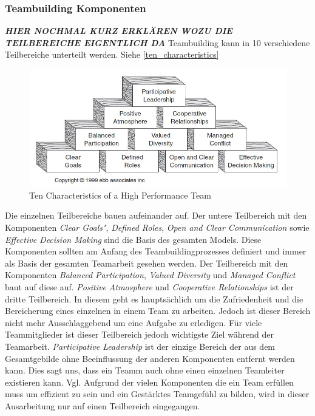 \documentclass[a4paper,11pt]{article}%
\renewcommand{\\}{\vspace*{0.5\baselineskip} \newline}
\begin{document}
{	
		\subsubsection{Teambuilding Komponenten}
	\textit{\textbf{HIER NOCHMAL KURZ ERKLÄREN WOZU DIE TEILBEREICHE EIGENTLICH DA}}
	Teambuilding kann in 10 verschiedene Teilbereiche unterteilt werden. Siehe \autoref{ten_characteristics}
	\begin{figure}[H]
		\begin{footnotesize}
			\includegraphics[width=\textwidth]{Abbildungen/Ten_Characteristics.JPG}
			\caption[Abbildung 1]{Ten Characteristics of a High Performance Team \citep[p. 27]{biech2007pfeiffer}}
			\label{ten_characteristics}
		\end{footnotesize}
	\end{figure}
	Die einzelnen Teilbereiche bauen aufeinander auf. Der untere Teilbereich mit den Komponenten \textit{Clear Goals"}, \textit{Defined Roles}, \textit{Open and Clear Communication} sowie \textit{Effective Decision Making} sind die Basis des gesamten Models. Diese Komponenten sollten am Anfang des Teambuildingprozesses definiert und immer als Basis der gesamten Teamarbeit gesehen werden.\\
	Der Teilbereich mit den Komponenten \textit{Balanced Participation}, \textit{Valued Diversity} und \textit{Managed Conflict} baut auf diese auf.\\
	\textit{Positive Atmosphere} und \textit{Cooperative Relationships} ist der dritte Teilbereich. In diesem geht es hauptsächlich um die Zufriedenheit und die Bereicherung eines einzelnen in einem Team zu arbeiten. Jedoch ist dieser Bereich nicht mehr Ausschlaggebend um eine Aufgabe zu erledigen. Für viele Teammitglieder ist dieser Teilbereich jedoch wichtigste Ziel während der Teamarbeit.\\
	\textit{Participative Leadership} ist der einzige Bereich der aus dem Gesamtgebilde ohne Beeinflussung der anderen Komponenten entfernt werden kann. Dies sagt uns, dass ein Teamm auch ohne einen einzelnen Teamleiter existieren kann. Vgl. \citep[p. 13-16]{biech2007pfeiffer}\\
	Aufgrund der vielen Komponenten die ein Team erfüllen muss um effizient zu sein und ein Gestärktes Teamgefühl zu bilden, wird in dieser Ausarbeitung nur auf einen Teilbereich eingegangen.
	
}
\end{document}
